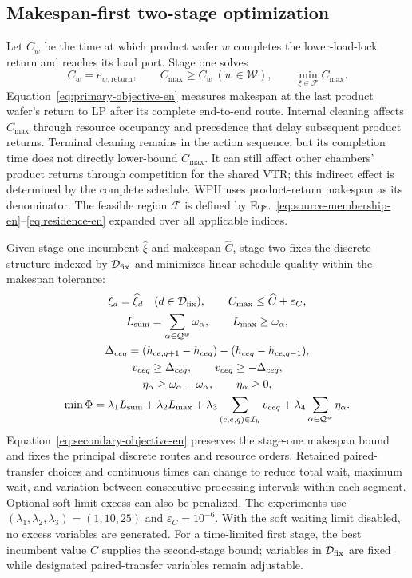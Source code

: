 \documentclass[journal]{IEEEtran}
\begin{document}
\subsection{Makespan-first two-stage optimization}

Let $C_w$ be the time at which product wafer $w$ completes the lower-load-lock return and reaches its load port. Stage one solves
\begin{equation}
C_w=e_{w,\mathrm{return}},\qquad
C_{\max}\ge C_w\ (w\in\mathcal W),\qquad
\min_{\xi\in\mathcal F}C_{\max}.
\label{eq:primary-objective-en}
\end{equation}
Equation~\eqref{eq:primary-objective-en} measures makespan at the last product wafer's return to LP after its complete end-to-end route. Internal cleaning affects $C_{\max}$ through resource occupancy and precedence that delay subsequent product returns. Terminal cleaning remains in the action sequence, but its completion time does not directly lower-bound $C_{\max}$. It can still affect other chambers' product returns through competition for the shared VTR; this indirect effect is determined by the complete schedule. WPH uses product-return makespan as its denominator. The feasible region $\mathcal F$ is defined by Eqs.~\eqref{eq:source-membership-en}--\eqref{eq:residence-en} expanded over all applicable indices.

Given stage-one incumbent $\widehat\xi$ and makespan $\widehat C$, stage two fixes the discrete structure indexed by $\mathcal D_{\rm fix}$ and minimizes linear schedule quality within the makespan tolerance:
\begin{equation}
\begin{gathered}
\xi_d=\widehat\xi_d\quad(d\in\mathcal D_{\rm fix}),\qquad
C_{\max}\le\widehat C+\varepsilon_C,\\
L_{\rm sum}=\sum_{\alpha\in\mathcal Q^w}\omega_\alpha,\qquad
L_{\max}\ge\omega_\alpha,\\
\Delta_{ceq}=(h_{ce,q+1}-h_{ceq})-(h_{ceq}-h_{ce,q-1}),\\
v_{ceq}\ge\Delta_{ceq},\qquad v_{ceq}\ge-\Delta_{ceq},\\
\eta_\alpha\ge\omega_\alpha-\bar\omega_\alpha,\qquad
\eta_\alpha\ge0,\\
\min\Phi=\lambda_1L_{\rm sum}+\lambda_2L_{\max}
+\lambda_3\sum_{(c,e,q)\in\mathcal I_h}v_{ceq}
+\lambda_4\sum_{\alpha\in\mathcal Q^w}\eta_\alpha.
\end{gathered}
\label{eq:secondary-objective-en}
\end{equation}
Equation~\eqref{eq:secondary-objective-en} preserves the stage-one makespan bound and fixes the principal discrete routes and resource orders. Retained paired-transfer choices and continuous times can change to reduce total wait, maximum wait, and variation between consecutive processing intervals within each segment. Optional soft-limit excess can also be penalized. The experiments use $(\lambda_1,\lambda_2,\lambda_3)=(1,10,25)$ and $\varepsilon_C=10^{-6}$. With the soft waiting limit disabled, no excess variables are generated. For a time-limited first stage, the best incumbent value $\widehat C$ supplies the second-stage bound; variables in $\mathcal D_{\rm fix}$ are fixed while designated paired-transfer variables remain adjustable.
\end{document}

